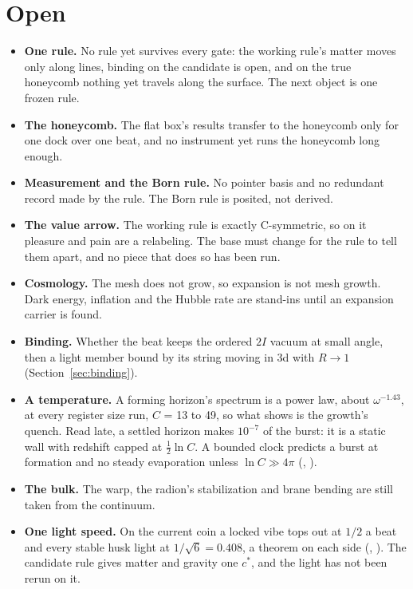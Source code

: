 \section{Open}
\label{sec:open}

\begin{itemize}
\item \textbf{One rule.} No rule yet survives every gate: the working rule's matter moves only along lines,
binding on the candidate is open, and on the true honeycomb nothing yet travels along the surface. The next object is one frozen rule.
\item \textbf{The honeycomb.} The flat box's results transfer to the honeycomb only for one dock over one beat, and
no instrument yet runs the honeycomb long enough.
\item \textbf{Measurement and the Born rule.} No pointer basis and no redundant record made by the rule. The Born
rule is posited, not derived.
\item \textbf{The value arrow.} The working rule is exactly C-symmetric, so on it pleasure and pain are a relabeling.
The base must change for the rule to tell them apart, and no piece that does so has been run.
\item \textbf{Cosmology.} The mesh does not grow, so expansion is not mesh growth. Dark energy, inflation and the
Hubble rate are stand-ins until an expansion carrier is found.
\item \textbf{Binding.} Whether the beat keeps the ordered $2I$ vacuum at small angle, then a light member bound by its
string moving in 3d with $R \to 1$ (Section~\ref{sec:binding}).
\item \textbf{A temperature.} A forming horizon's spectrum is a power law, about $\omega^{-1.43}$, at every register
size run, $C$ = 13 to 49, so what shows is the growth's quench. Read late, a settled horizon makes $10^{-7}$ of the
burst: it is a static wall with redshift capped at $\tfrac12 \ln C$. A bounded clock predicts a burst at formation and
no steady evaporation unless $\ln C \gg 4\pi$ (, ).
\item \textbf{The bulk.} The warp, the radion's stabilization and brane bending are still taken from the continuum.
\item \textbf{One light speed.} On the current coin a locked vibe tops out at $1/2$ a beat and every stable husk light
at $1/\sqrt6 = 0.408$, a theorem on each side (, ). The candidate rule gives matter
and gravity one $c^*$, and the light has not been rerun on it.

\end{itemize}
